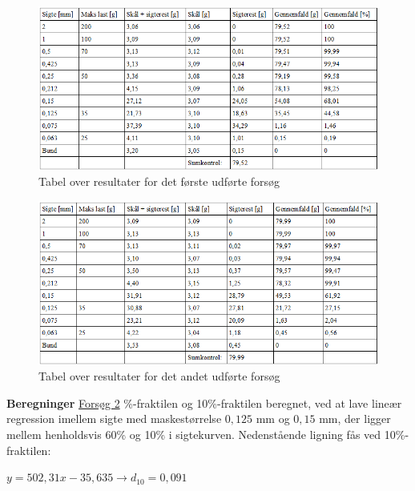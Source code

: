 \begin{figure}[htbp] \centering
	\begin{minipage}[b]{0.48\textwidth}\centering
		\includegraphics[width=1.7\textwidth]{billeder/forsogetsigteanalyse.png}
		\caption{Tabel over resultater for det første udførte forsøg}
		\label{fig:forsoget}
	\end{minipage}\hfill
\end{figure}

\begin{figure}[htbp] \centering
	\begin{minipage}[b]{0.48\textwidth}\centering
		\includegraphics[width=1.7\textwidth]{billeder/forsogtosigteanalyse.png}
		\caption{Tabel over resultater for det andet udførte forsøg}
		\label{fig:forsogto}
	\end{minipage}\hfill
\end{figure}

\textbf{Beregninger}
\newline
\underline{Forsøg 2}
\%-fraktilen og 10\%-fraktilen beregnet, ved at lave lineær regression imellem sigte med maskestørrelse $0,\!125$ mm og $0,\!15$ mm, der ligger mellem henholdsvis 60\% og 10\% i sigtekurven. 
\newline
\newline
Nedenstående ligning fås ved 10\%-fraktilen:
\begin{center}
	$y = 502,\!31x - 35,\!635 \rightarrow d_{10}=0,\!091$
\end{center}

